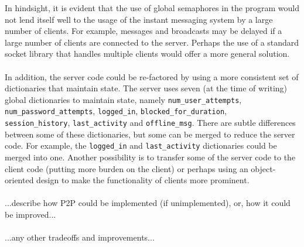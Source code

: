 \documentclass[12pt,a4paper]{article}
\begin{document}
In hindsight, it is evident that the use of global semaphores in the program would not lend itself well to the usage of the instant messaging system by a large number of clients. For example, messages and broadcasts may be delayed if a large number of clients are connected to the server. Perhaps the use of a standard socket library that handles multiple clients would offer a more general solution.
\\\\
In addition, the server code could be re-factored by using a more consistent set of dictionaries that maintain state. The server uses seven (at the time of writing) global dictionaries to maintain state, namely \verb|num_user_attempts|, \verb|num_password_attempts|, \verb|logged_in|, \verb|blocked_for_duration|, \\ \verb|session_history|, \verb|last_activity| and \verb|offline_msg|. There are subtle differences between some of these dictionaries, but some can be merged to reduce the server code. For example, the \verb|logged_in| and \verb|last_activity| dictionaries could be merged into one. Another possibility is to transfer some of the server code to the client code (putting more burden on the client) or perhaps using an object-oriented design to make the functionality of clients more prominent.
\\\\
...describe how P2P could be implemented (if unimplemented), or, how it could be improved...
\\\\
...any other tradeoffs and improvements...
\end{document}
